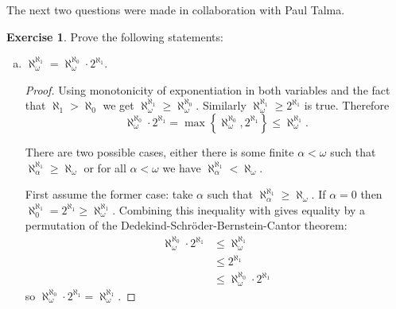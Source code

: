 \documentclass{article}
\theoremstyle{definition}
\newtheorem{question}{Exercise}
\newcommand{\set}[1]{\left\{#1\right\}}
\begin{document}
The next two questions were made in collaboration with Paul Talma.

\begin{question}
    Prove the following statements:
    \begin{enumerate}[a.]
        \item \(\aleph_{\omega}^{\aleph_{1}}=\aleph_{\omega}^{\aleph_{0}}\cdot
              2^{\aleph_{1}}\).

              \begin{proof}
                  Using monotonicity of exponentiation in both variables and the
                  fact that \(\aleph_{1}>\aleph_{0}\) we get
                  \(\aleph_{\omega}^{\aleph_{1}}\geq\aleph_{\omega}^{\aleph_{0}}\).
                  Similarly \(\aleph_{\omega}^{\aleph_{1}}\geq 2^{\aleph_{1}}\)
                  is true. Therefore
                  \begin{equation}
                      \label{for:ineq1}
                      \aleph_{\omega}^{\aleph_{0}}\cdot 2^{\aleph_{1}}
                      =\max\set{\aleph_{\omega}^{\aleph_{0}},2^{\aleph_{1}}}\leq\aleph_{\omega}^{\aleph_{1}}.
                  \end{equation}

                  There are two possible cases, either there is some finite
                  \(\alpha<\omega\) such that
                  \(\aleph_{\alpha}^{\aleph_{1}}\geq\aleph_{\omega}\) or for all
                  \(\alpha<\omega\) we have
                  \(\aleph_{\alpha}^{\aleph_{1}}<\aleph_{\omega}\).

                  First assume the former case: take \(\alpha\) such that
                  \(\aleph_{\alpha}^{\aleph_{1}}\geq\aleph_{\omega}\). If
                  \(\alpha=0\) then
                  \(\aleph_{0}^{\aleph_{1}}=2^{\aleph_{1}}\geq\aleph_{\omega}^{\aleph_{1}}\).
                  Combining this inequality with  gives equality
                  by a permutation of the Dedekind-Schröder-Bernstein-Cantor
                  theorem:
                  \begin{align*}
                      \aleph_{\omega}^{\aleph_{0}}\cdot2^{\aleph_{1}} & \leq\aleph_{\omega}^{\aleph_{1}}                    \\
                                                                      & \leq 2^{\aleph_{1}}                                 \\
                                                                      & \leq\aleph_{\omega}^{\aleph_{0}}\cdot2^{\aleph_{1}}
                  \end{align*}
                  so \(\aleph_{\omega}^{\aleph_{0}}\cdot2^{\aleph_{1}}=\aleph_{\omega}^{\aleph_{1}}\).


\end{proof}
\end{enumerate}
\end{question}
\end{document}
